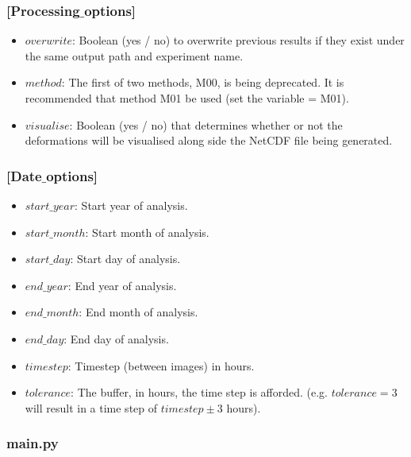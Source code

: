 \documentclass{article}
\begin{document}
        \subsubsection*{[Processing$\_$options]}

            \begin{itemize}
                \item $overwrite$: Boolean (yes / no) to overwrite previous results if they exist under the same output path and experiment name.
                \item $method$: The first of two methods, M00, is being deprecated. It is recommended that method M01 be used (set the variable = M01).
                \item $visualise$: Boolean (yes / no) that determines whether or not the deformations will be visualised along side the NetCDF file being generated.
            \end{itemize}

        \subsubsection*{[Date$\_$options]}

            \begin{itemize}
                \item $start\_year$: Start year of analysis.
                \item $start\_month$: Start month of analysis.
                \item $start\_day$: Start day of analysis.
                \item $end\_year$: End year of analysis.
                \item $end\_month$: End month of analysis.
                \item $end\_day$: End day of analysis.
                \item $timestep$: Timestep (between images) in hours.
                \item $tolerance$: The buffer, in hours, the time step is afforded. (e.g. $tolerance = 3$ will result in a time step of $timestep \pm 3$ hours).
            \end{itemize}

        \subsubsection*{\textbf{main.py}}
\end{document}
